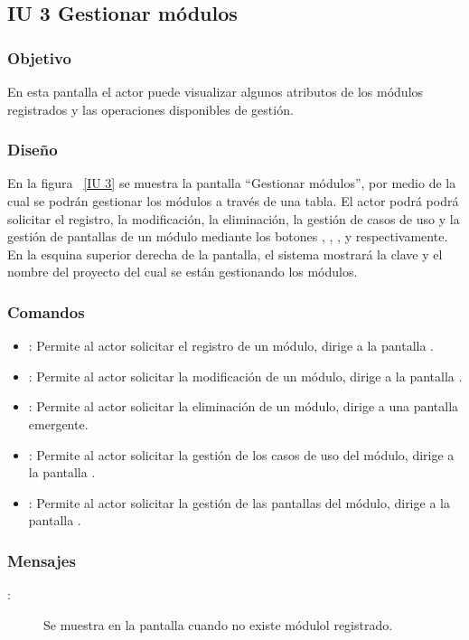 \newpage 
\subsection{IU 3 Gestionar módulos}
\subsubsection{Objetivo}
	
	En esta pantalla el actor puede visualizar algunos atributos de los módulos registrados y las operaciones disponibles de gestión.

\subsubsection{Diseño}

    En la figura ~\ref{IU 3} se muestra la pantalla ``Gestionar módulos'', por medio de la cual 
    se podrán gestionar los módulos a través de una tabla. El actor podrá podrá solicitar el registro, la modificación, la eliminación, la gestión de casos de uso y la gestión de pantallas
    de un módulo mediante los botones
    , \btnEditar, \btnEliminar, \btnCU y \btnIU respectivamente. \\
	
	En la esquina superior derecha de la pantalla, el sistema mostrará la clave y el nombre del proyecto del cual se están gestionando los módulos.



\subsubsection{Comandos}
\begin{itemize}
	\item {}: Permite al actor solicitar el registro de un módulo, dirige a la pantalla .
	\item \btnEditar[Modificar]: Permite al actor solicitar la modificación de un módulo, dirige a la pantalla .
	\item \btnEliminar[Eliminar]: Permite al actor solicitar la eliminación de un módulo, dirige a una pantalla emergente.
	\item {}: Permite al actor solicitar la gestión de los casos de uso del módulo, dirige a la pantalla .
	\item {}: Permite al actor solicitar la gestión de las pantallas del módulo, dirige a la pantalla .
\end{itemize}
\subsubsection{Mensajes}
	
\begin{description}
	\item[:] Se muestra en la pantalla  cuando no existe módulol registrado.
\end{description}
